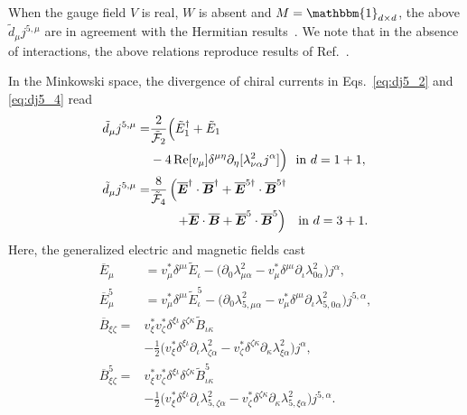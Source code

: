 \documentclass[prl,aps,showpacs,twocolumn,preprintnumbers,
amsmath,amssymb,superscriptaddress,longbibliography]{revtex4-1}
\def\id{\mathbbm{1}}
\renewcommand{\Re}{\mathop{\mathrm{Re}}}
\newcommand{\bolds}[1]{\boldsymbol #1}
\begin{document}
When the gauge field $V$ is real, $W$ is absent and $M= \id_{d \times d}$, the above $\tilde{d}_{\mu}  j^{5,\mu}$ are in agreement with the Hermitian results~\cite{Rylands2021, Parhizkar2023}. We note that in the absence of interactions, the above relations reproduce results of Ref.~\cite{Sayyad2022ca}.

In the Minkowski space, the divergence of chiral currents in Eqs.~\eqref{eq:dj5_2} and \eqref{eq:dj5_4} read
\begin{align}
\tilde{d}_{\mu} j^{5,\mu}  =
& \frac{  2}{\tilde{\cal F}_{2}} 
     \Big(   \tilde{E}_{1}^{\dagger} + \tilde{E}_{1}
\nonumber \\
&
-4 \Re[v_{\mu}] \delta^{\mu \eta} \partial_{\eta}[ \lambda_{\nu \alpha}^{2} j^{\alpha}]
\Big)
\, \,
\text{
 in $d=1+1$} 
,\label{eq:dJ5_1p1}
\\
\tilde{d}_{\mu} j^{5,\mu} = & 
 \frac{   8 }{\tilde{\cal F}_{4}} 
     \left(   \overline{\bolds{E}}^{\dagger}\cdot \overline{\bolds{B}}^{\dagger} + \overline{\bolds{E}}^{5\dagger}\cdot \overline{\bolds{B}}^{5\dagger} 
     \right.
\nonumber \\
& \qquad 
\left.
+\overline{\bolds{E}}\cdot \overline{\bolds{B}}+ \overline{\bolds{E}}^{5}\cdot \overline{\bolds{B}}^{5} 
\right) 
\,
\, \, 
\text{ in $d=3+1$}.
\label{eq:dJ5_3p1}
\end{align}
Here, the generalized electric and magnetic fields cast
\begin{align}
    \overline{E}_{\mu}
    &=v_{\mu}^{ *}  \delta^{\mu \iota} \tilde{E}_{\iota}
    -
    \big(
\partial_{0} {\lambda}^{2}_{\mu \alpha} 
- v_{\mu}^{*} \delta^{\mu \iota} \partial_{\iota} {\lambda}^{2}_{0 \alpha} 
    \big) j^{\alpha}
    \label{eq:Ebar}
    ,\\
        \overline{E}^{5}_{\mu}
    &=v_{\mu}^{ *} \delta^{\mu \iota} \tilde{E}^{5}_{\iota}
    -
    \big(
\partial_{0} {\lambda}^{2}_{5,\mu \alpha} 
- v_{\mu}^{*} \delta^{\mu \iota} \partial_{\iota} {\lambda}^{2}_{5,0 \alpha} 
    \big) j^{5,\alpha}
     \label{eq:E5bar}
       ,\\
        \overline{B}_{\xi \zeta}
    =&v_{\xi}^{ *} v_{\zeta}^{ *} \delta^{\xi \iota} \delta^{\zeta \kappa} \tilde{B}_{\iota \kappa}
    \nonumber \\
    &
    -
     \frac{1}{2} 
    \big(
v_{\xi}^{ *} \delta^{\xi \iota} \partial_{\iota}  {\lambda}^{2}_{\zeta \alpha} 
- v_{\zeta}^{*} \delta^{\zeta \kappa} \partial_{\kappa} {\lambda}^{2}_{\xi \alpha} 
    \big) j^{\alpha}
     \label{eq:Bbar}
    ,\\
        \overline{B}^{5}_{\xi \zeta}
    =&v_{\xi}^{ *} v_{\zeta}^{ *} \delta^{\xi \iota} \delta^{\zeta \kappa} \tilde{B}^{5}_{\iota \kappa}
    \nonumber \\
    &
    -
  \frac{1}{2}  \big(
v_{\xi}^{ *} \delta^{\xi \iota} \partial_{\iota}  {\lambda}^{2}_{5,\zeta \alpha} 
- v_{\zeta}^{*} \delta^{\zeta \kappa} \partial_{\kappa} {\lambda}^{2}_{5,\xi \alpha} 
    \big) j^{5,\alpha}
     \label{eq:B5bar}
    .
\end{align}
\end{document}
